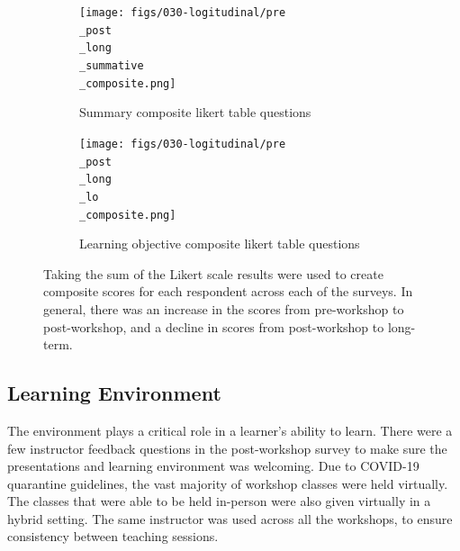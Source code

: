 \documentclass[030-workshop.tex]{subfiles}
\begin{document}
            \begin{figure}[!hbtp]
                \centering
                \begin{subfigure}[h]{0.45\textwidth}
                    \centering
                    \texttt{[image: figs/030-logitudinal/pre\\\_post\\\_long\\\_summative\\\_composite.png]}
                    \caption[Pre-Post-workshop and Long-term Survey for summary likert composite]
                    {Summary composite likert table questions}
                    \label{sfig:pre-post-long-composite-summary}
                \end{subfigure}
                \hfill
                \begin{subfigure}[h]{0.45\textwidth}
                    \centering
                    \texttt{[image: figs/030-logitudinal/pre\\\_post\\\_long\\\_lo\\\_composite.png]}
                    \caption[Pre-Post-workshop and Long-term Survey for learning objective likert composite]
                    {Learning objective composite likert table questions}
                    \label{sfig:pre-post-long-composite-lo}
                \end{subfigure}
                \caption[Summary table and learning objective composite Likert questions (pre, post, long-term)]
                {Taking the sum of the Likert scale results were used to create composite scores for each respondent
                 across each of the surveys.
                 In general, there was an increase in the scores from pre-workshop to post-workshop,
                 and a decline in scores from post-workshop to long-term.
                }
                \label{fig:pre-post-long-composite-summary-lo}
            \end{figure}

    \subsection{Learning Environment}

        The environment plays a critical role in a learner's ability to learn.
        There were a few instructor feedback questions in the post-workshop survey to make sure
        the presentations and learning environment was welcoming.
        Due to COVID-19 quarantine guidelines,
        the vast majority of workshop classes were held virtually.
        The classes that were able to be held in-person were also given virtually in a hybrid setting.
        The same instructor was used across all the workshops, to ensure consistency between teaching sessions.
\end{document}
